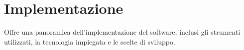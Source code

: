 \chapter{Implementazione} \label{chap:Implementazione}
Offre una panoramica dell'implementazione del software, inclusi gli strumenti utilizzati, la tecnologia impiegata e le scelte di sviluppo.